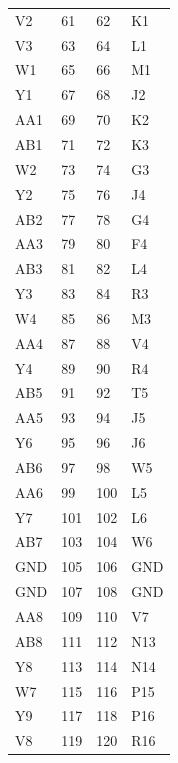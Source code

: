 \documentclass[12pt]{article}
\begin{document}
\begin{longtable}{P{2.5cm}P{1.5cm}P{1.5cm}P{2.5cm}}
 V2     & 61 & 62 & K1 \\
 V3     & 63 & 64 & L1 \\
 W1     & 65 & 66 & M1 \\
 Y1     & 67 & 68 & J2 \\
 AA1    & 69 & 70 & K2 \\
 AB1    & 71 & 72 & K3 \\
 W2     & 73 & 74 & G3 \\
 Y2     & 75 & 76 & J4 \\
 AB2    & 77 & 78 & G4 \\
 AA3    & 79 & 80 & F4 \\
 AB3    & 81 & 82 & L4 \\
 Y3     & 83 & 84 & R3 \\
 W4     & 85 & 86 & M3 \\
 AA4    & 87 & 88 & V4 \\
 Y4     & 89 & 90 & R4 \\
 AB5    & 91 & 92 & T5 \\
 AA5    & 93 & 94 & J5 \\
 Y6     & 95 & 96 & J6 \\
 AB6    & 97 & 98 & W5 \\
 AA6    & 99 & 100 & L5 \\
 Y7     & 101 & 102 & L6 \\
 AB7    & 103 & 104 & W6 \\
 GND    & 105 & 106 & GND \\
 GND    & 107 & 108 & GND \\
 AA8    & 109 & 110 & V7 \\
 AB8    & 111 & 112 & N13 \\
 Y8     & 113 & 114 & N14 \\
 W7     & 115 & 116 & P15 \\
 Y9     & 117 & 118 & P16 \\
 V8     & 119 & 120 & R16 \\

\end{longtable}
\end{document}
